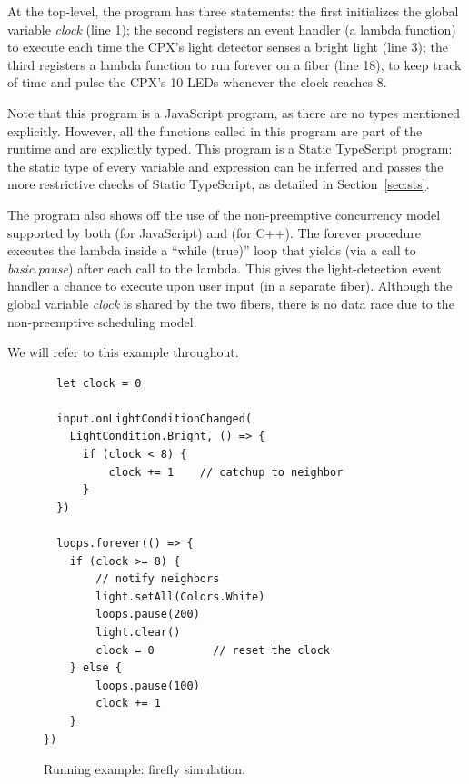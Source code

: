 At the top-level, the program has three statements:
the first initializes the global variable \emph{clock} (line 1); the
second registers an event handler (a lambda function) to execute
each time the CPX's light detector senses a bright light (line 3); the
third registers a lambda function to run forever on a fiber (line 18),
to keep track of time and pulse the CPX's 10 LEDs whenever the
clock reaches 8.

Note that this program is a JavaScript program, as there are no
types mentioned explicitly. However, all the functions called in
this program are part of the runtime and are explicitly
typed. This program is a Static TypeScript program:
the static type of every variable and expression
can be inferred and passes the more restrictive checks
of Static TypeScript, as detailed in Section~\ref{sec:sts}.

The program also shows off the use of the non-preemptive concurrency
model supported by both \MC (for JavaScript) and \CO (for C++).
The forever procedure executes the lambda inside a ``while (true)''
loop that yields (via a call to \emph{basic.pause}) after each call to the lambda.
This gives the light-detection event handler a chance to execute
upon user input (in a separate fiber). Although the global variable \emph{clock} is
shared by the two fibers, there is no data race due to the non-preemptive
scheduling model.

We will refer to this example throughout.

\begin{figure}
\begin{lstlisting}
  let clock = 0

  input.onLightConditionChanged(
    LightCondition.Bright, () => {
      if (clock < 8) {
          clock += 1    // catchup to neighbor
      }
  })

  loops.forever(() => {
    if (clock >= 8) {
        // notify neighbors
        light.setAll(Colors.White)
        loops.pause(200)
        light.clear()
        clock = 0         // reset the clock
    } else {
        loops.pause(100)
        clock += 1
    }
})
\end{lstlisting}
\caption{\label{fig:example}Running example: firefly simulation.}
\end{figure}